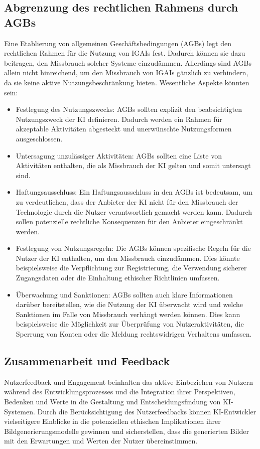 \documentclass[12pt]{report}
\begin{document}
\subsection{Abgrenzung des rechtlichen Rahmens durch \ac{AGB}s}
Eine Etablierung von allgemeinen Geschäftsbedingungen (AGBs) legt den rechtlichen Rahmen für die Nutzung von \ac{IGAI}s fest. Dadurch können sie dazu beitragen, den Missbrauch solcher Systeme einzudämmen. 
Allerdings sind AGBs allein nicht hinreichend, um den Missbrauch von \ac{IGAI}s gänzlich zu verhindern, da sie keine aktive Nutzungsbeschränkung bieten. Wesentliche Aspekte könnten sein:
\begin{itemize}
    \item Festlegung des Nutzungszwecks: \ac{AGB}s sollten explizit den beabsichtigten Nutzungszweck der \ac{KI} definieren. Dadurch werden ein Rahmen für akzeptable Aktivitäten abgesteckt und unerwünschte Nutzungsformen ausgeschlossen.
    \item Untersagung unzulässiger Aktivitäten: \ac{AGB}s sollten eine Liste von Aktivitäten enthalten, die als Missbrauch der \ac{KI} gelten und somit untersagt sind.
    \item Haftungsausschluss: Ein Haftungsausschluss in den \ac{AGB}s ist bedeutsam, um zu verdeutlichen, dass der Anbieter der \ac{KI} nicht für den Missbrauch der Technologie durch die Nutzer verantwortlich gemacht werden kann. Dadurch sollen potenzielle rechtliche Konsequenzen für den Anbieter eingeschränkt werden.
    \item Festlegung von Nutzungsregeln: Die \ac{AGB}s  können spezifische Regeln für die Nutzer der \ac{KI} enthalten, um den Missbrauch einzudämmen. Dies könnte beispielsweise die Verpflichtung zur Registrierung, die Verwendung sicherer Zugangsdaten oder die Einhaltung ethischer Richtlinien umfassen.
    \item Überwachung und Sanktionen: \ac{AGB}s sollten auch klare Informationen darüber bereitstellen, wie die Nutzung der \ac{KI} überwacht wird und welche Sanktionen im Falle von Missbrauch verhängt werden können. Dies kann beispielsweise die Möglichkeit zur Überprüfung von Nutzeraktivitäten, die Sperrung von Konten oder die Meldung rechtswidrigen Verhaltens umfassen.
\end{itemize}

\subsection{Zusammenarbeit und Feedback}
Nutzerfeedback und Engagement beinhalten das aktive Einbeziehen von Nutzern während des Entwicklungsprozesses und die Integration ihrer Perspektiven, Bedenken und Werte in die Gestaltung und Entscheidungsfindung von \ac{KI}-Systemen. Durch die Berücksichtigung des Nutzerfeedbacks können \ac{KI}-Entwickler vielseitigere Einblicke in die potenziellen ethischen Implikationen ihrer Bildgenerierungsmodelle gewinnen und sicherstellen, dass die generierten Bilder mit den Erwartungen und Werten der Nutzer übereinstimmen.
\end{document}
